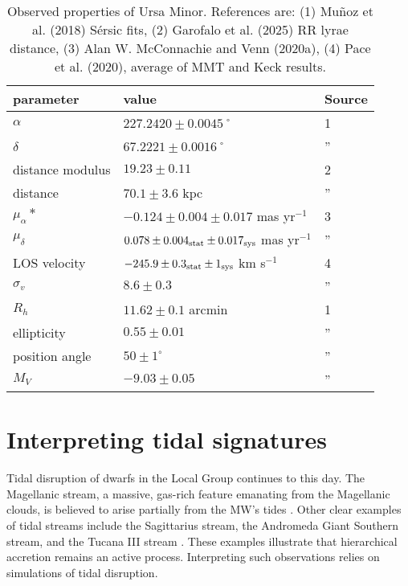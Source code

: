 \begin{table*}[t]
\centering
\caption[Observed Properties of Ursa Minor]{Observed properties of Ursa Minor. References are: (1) Muñoz et al. (2018) Sérsic fits, (2) Garofalo et al. (2025) RR lyrae distance, (3) Alan W. McConnachie and Venn (2020a), (4) Pace et al. (2020), average of MMT and Keck results. }
\label{tbl:umi_obs_props}
\begin{tabular}{lll}
\toprule
parameter & value & Source\\
\midrule
$\alpha$ & $ 227.2420 \pm 0.0045$˚ & 1\\
$\delta$ & $67.2221 \pm 0.0016$˚ & ”\\
distance modulus & $19.23 \pm 0.11$ & 2\\
distance & $70.1 \pm 3.6$ kpc & ”\\
$\mu_\alpha*$ & $-0.124 \pm 0.004 \pm 0.017$ mas yr$^{-1}$ & 3\\
$\mu_\delta$ & $0.078 \pm 0.004_{\rm stat} \pm 0.017_{\rm sys}$ mas yr$^{-1}$ & ”\\
LOS velocity & $-245.9 \pm 0.3_{\rm stat} \pm 1_{\rm sys}$ km s$^{-1}$ & 4\\
$\sigma_v$ & $8.6 \pm 0.3$ & ”\\
$R_h$ & $11.62 \pm 0.1$ arcmin & 1\\
ellipticity & $0.55 \pm 0.01$ & ”\\
position angle & $50 \pm 1^\circ$ & ”\\
$M_V$ & $-9.03 \pm 0.05$ & ”\\
\bottomrule
\end{tabular}
\end{table*}

\section{Interpreting tidal signatures}\label{sec:tidal_theory}

Tidal disruption of dwarfs in the Local Group continues to this day. The
Magellanic stream, a massive, gas-rich feature emanating from the
Magellanic clouds, is believed to arise partially from the MW's tides
\citep{putman+1998, diaz+bekki2012, donghia+fox2016}. Other clear
examples of tidal streams include the Sagittarius stream, the Andromeda
Giant Southern stream, and the Tucana III stream
\citep[e.g.,][]{ibata+gilmore+irwin1994, ibata+2001, li+2018}. These
examples illustrate that hierarchical accretion remains an active
process. Interpreting such observations relies on simulations of tidal
disruption.

